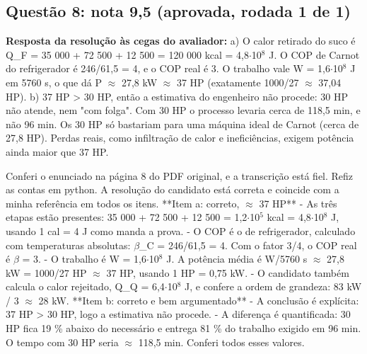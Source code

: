 \documentclass{article}%
\begin{document}
\subsection*{Questão 8: nota 9,5 (aprovada, rodada 1 de 1)}%
\textbf{Resposta da resolução às cegas do avaliador:} a) O calor retirado do suco é Q\_F = 35 000 + 72 500 + 12 500 = 120 000 kcal = 4,8$\cdot$10$^{8}$ J. O COP de Carnot do refrigerador é 246/61,5 = 4, e o COP real é 3. O trabalho vale W = 1,6$\cdot$10$^{8}$ J em 5760 s, o que dá P $\approx$ 27,8 kW $\approx$ 37 HP (exatamente 1000/27 $\approx$ 37,04 HP).\newline%
\newline%
b) 37 HP > 30 HP, então a estimativa do engenheiro não procede: 30 HP não atende, nem "com folga". Com 30 HP o processo levaria cerca de 118,5 min, e não 96 min. Os 30 HP só bastariam para uma máquina ideal de Carnot (cerca de 27,8 HP). Perdas reais, como infiltração de calor e ineficiências, exigem potência ainda maior que 37 HP.\par %
Conferi o enunciado na página 8 do PDF original, e a transcrição está fiel. Refiz as contas em python. A resolução do candidato está correta e coincide com a minha referência em todos os itens.\newline%
\newline%
**Item a: correto, $\approx$ 37 HP**\newline%
{-} As três etapas estão presentes: 35 000 + 72 500 + 12 500 = 1,2$\cdot$10$^{5}$ kcal = 4,8$\cdot$10$^{8}$ J, usando 1 cal = 4 J como manda a prova.\newline%
{-} O COP é o de refrigerador, calculado com temperaturas absolutas: $\beta$\_C = 246/61,5 = 4. Com o fator 3/4, o COP real é $\beta$ = 3.\newline%
{-} O trabalho é W = 1,6$\cdot$10$^{8}$ J. A potência média é W/5760 s $\approx$ 27,8 kW = 1000/27 HP $\approx$ 37 HP, usando 1 HP = 0,75 kW.\newline%
{-} O candidato também calcula o calor rejeitado, Q\_Q = 6,4$\cdot$10$^{8}$ J, e confere a ordem de grandeza: 83 kW / 3 $\approx$ 28 kW.\newline%
\newline%
**Item b: correto e bem argumentado**\newline%
{-} A conclusão é explícita: 37 HP > 30 HP, logo a estimativa não procede.\newline%
{-} A diferença é quantificada: 30 HP fica 19 \% abaixo do necessário e entrega 81 \% do trabalho exigido em 96 min. O tempo com 30 HP seria $\approx$ 118,5 min. Conferi todos esses valores.\newline%
\end{document}
